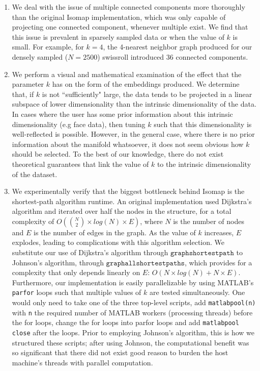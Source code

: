 \documentclass[a4paper,12pt]{report}
\begin{document}
\begin{enumerate}
\item We deal with the issue of multiple connected components more thoroughly than the original Isomap implementation, which was only capable of
projecting one connected component, whenever multiple exist. We find that this issue is prevalent in sparsely sampled data or when the value of $k$ is
small. For example, for $k=4$, the 4-nearest neighbor graph produced for our densely sampled ($N=2500$) swissroll introduced 36 connected components.

\item We perform a visual and mathematical examination of the effect that the parameter $k$ has on the form of the embeddings produced. We determine that, if $k$ is not ``sufficiently" large, the data tends to be projected in a linear subspace of lower dimensionality than the intrinsic dimensionality of the data. In cases where the user has some prior information about this intrinsic dimensionality (e.g face data), then tuning $k$ such
that this dimensionality is well-reflected is possible. However, in the general case, where there is no prior information about the manifold whatsoever,
it does not seem obvious how $k$ should be selected. To the best of our knowledge, there do not exist theoretical guarantees that link the value of $k$ to the intrinsic dimensionality of the dataset.

\item We experimentally verify that the biggest bottleneck behind Isomap is the shortest-path algorithm runtime. An original implementation used Dijkstra's algorithm and iterated over half the nodes in the structure, for a total complexity of $O({{N}\choose{2}}\times log(N)\times E)$, where $N$ is the number of nodes and $E$ is the number of edges in the graph. As the value of $k$ increases, $E$ explodes, leading to complications with this algorithm selection. We substitute our use of Dijkstra's algorithm through $\texttt{graphshortestpath}$ to Johnson's algorithm, through $\texttt{graphallshortestpaths}$, which provides for a complexity that only depends linearly on $E$: $O(N\times log(N) + N \times E)$. Furthermore,
our implementation is easily parallelizable by using MATLAB's \texttt{parfor} loops such that multiple values of $k$ are tested simultaneously. One would only need to take one of the three top-level scripts, add
\texttt{matlabpool(n)} with \texttt{n} the required number of MATLAB workers (processing threads) before the for loops, change the for loops into parfor loops and add \texttt{matlabpool close} after the loops. Prior to employing Johnson's algorithm, this is how we structured these scripts; after using Johnson, the computational benefit was so significant that there did not exist good reason to burden the host machine's threads with parallel computation.
\end{enumerate}




\end{document}
